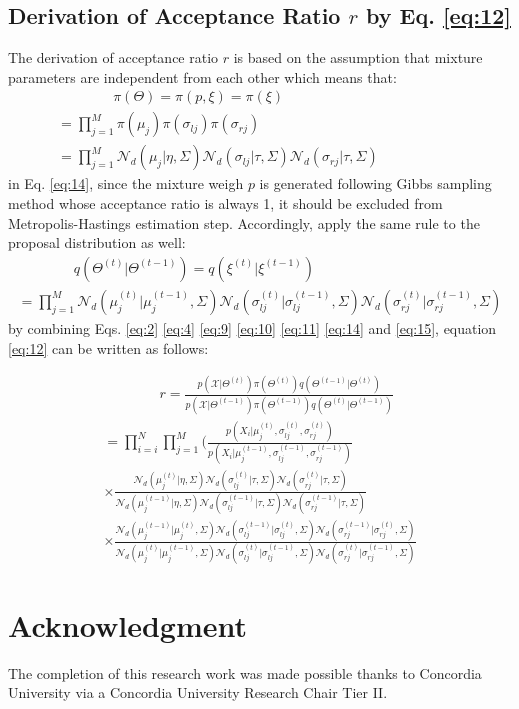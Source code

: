 \documentclass[conference]{llncs}
\begin{document}
\subsection{Derivation of Acceptance Ratio $r$ by Eq. \eqref{eq:12}}
The derivation of acceptance ratio $r$ is based on the assumption that mixture parameters are independent from each other which means that:
\bigskip
\begin{multline}
\qquad\qquad\pi(\Theta) = \pi(p,\xi) = \pi(\xi) \\
= \prod_{j=1}^M\pi(\mu_j)\pi(\sigma_{lj})\pi(\sigma_{rj}) \qquad\qquad\qquad\qquad\qquad\\
= \prod_{j=1}^M\mathcal{N}_d(\mu_j|\eta,\Sigma)\mathcal{N}_d(\sigma_{lj}|\tau,\Sigma)\mathcal{N}_d(\sigma_{rj}|\tau,\Sigma)\qquad\qquad\qquad
\label{eq:14}
\end{multline}
in Eq. \eqref{eq:14}, since the mixture weigh $p$ is generated following Gibbs sampling method whose acceptance ratio is always 1, it should be excluded from Metropolis-Hastings estimation step. Accordingly, apply the same rule to the proposal distribution as well:
\begin{multline}
\qquad\qquad q(\Theta^{(t)}|\Theta^{(t-1)}) = q(\xi^{(t)}|\xi^{(t-1)}) \\
= \prod_{j=1}^M\mathcal{N}_d(\mu_j^{(t)}|\mu_j^{(t-1)},\Sigma)\mathcal{N}_d(\sigma_{lj}^{(t)}|\sigma_{lj}^{(t-1)},\Sigma)\mathcal{N}_d(\sigma_{rj}^{(t)}|\sigma_{rj}^{(t-1)},\Sigma)
\label{eq:15}
\end{multline}
by combining Eqs. \eqref{eq:2} \eqref{eq:4} \eqref{eq:9} \eqref{eq:10} \eqref{eq:11} \eqref{eq:14} and \eqref{eq:15}, equation \eqref{eq:12} can be written as follows:

\begin{multline}
\qquad\qquad r = \frac{p(\mathcal{X}|\Theta^{(t)})\pi(\Theta^{(t)})q(\Theta^{(t-1)}|\Theta^{(t)})}{p(\mathcal{X}|\Theta^{(t-1)})\pi(\Theta^{(t-1)})q(\Theta^{(t)}|\Theta^{(t-1)})} \\
= \prod_{i=i}^N \prod_{j=1}^M(\frac{p(X_i|\mu_j^{(t)},\sigma_{lj}^{(t)},\sigma_{rj}^{(t)})}
{p(X_i|\mu_j^{(t-1)},\sigma_{lj}^{(t-1)},\sigma_{rj}^{(t-1)})} \qquad\qquad\\
\times \frac{\mathcal{N}_d(\mu_j^{(t)}|\eta,\Sigma)\mathcal{N}_d(\sigma_{lj}^{(t)}|\tau,\Sigma)\mathcal{N}_d(\sigma_{rj}^{(t)}|\tau,\Sigma)}{\mathcal{N}_d(\mu_j^{(t-1)}|\eta,\Sigma)\mathcal{N}_d(\sigma_{lj}^{(t-1)}|\tau,\Sigma)\mathcal{N}_d(\sigma_{rj}^{(t-1)}|\tau,\Sigma)} \\
\times \frac{\mathcal{N}_d(\mu_j^{(t-1)}|\mu_j^{(t)},\Sigma)\mathcal{N}_d(\sigma_{lj}^{(t-1)}|\sigma_{lj}^{(t)},\Sigma)\mathcal{N}_d(\sigma_{rj}^{(t-1)}|\sigma_{rj}^{(t)},\Sigma)}{\mathcal{N}_d(\mu_j^{(t)}|\mu_j^{(t-1)},\Sigma)\mathcal{N}_d(\sigma_{lj}^{(t)}|\sigma_{lj}^{(t-1)},\Sigma)\mathcal{N}_d(\sigma_{rj}^{(t)}|\sigma_{rj}^{(t-1)},\Sigma)}
\label{eq:16}
\end{multline}

\section*{Acknowledgment}
The completion of this research work was made possible thanks to Concordia University via a Concordia University Research Chair Tier II.



\end{document}
